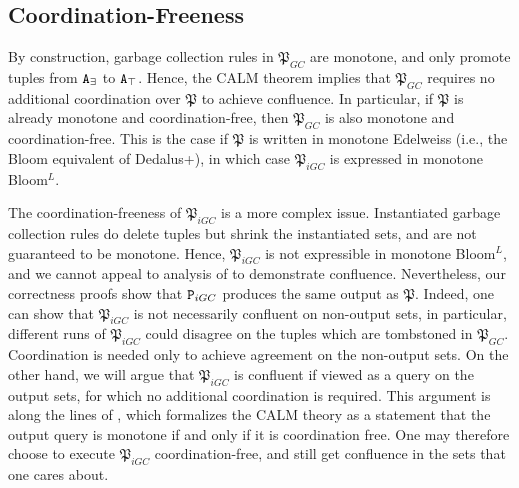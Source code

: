 \subsection{Coordination-Freeness}
By construction, garbage collection rules in $\mathfrak{P}_{GC}$ are monotone, and only promote tuples from $\tt{A}_\exists$ to $\tt{A}_\top$.
Hence, the CALM theorem implies that $\mathfrak{P}_{GC}$ requires no additional coordination over $\mathfrak{P}$ to achieve confluence.
In particular, if $\mathfrak{P}$ is already monotone and coordination-free, then $\mathfrak{P}_{GC}$ is also monotone and coordination-free.
This is the case if $\mathfrak{P}$ is written in monotone Edelweiss (i.e., the Bloom equivalent of Dedalus+), in which case $\mathfrak{P}_{iGC}$ is expressed in monotone Bloom$^L$.

The coordination-freeness of $\mathfrak{P}_{iGC}$ is a more complex issue.
Instantiated garbage collection rules do delete tuples but shrink the instantiated sets, and are not guaranteed to be monotone.
Hence, $\mathfrak{P}_{iGC}$ is not expressible in monotone Bloom$^L$, and we cannot appeal to analysis of \cite{marczak2012confluence} to demonstrate confluence.
Nevertheless, our correctness proofs show that $\tt{P}_{iGC}$ produces the same output as $\mathfrak{P}$.
Indeed, one can show that $\mathfrak{P}_{iGC}$ is not necessarily confluent on non-output sets, in particular, different runs of $\mathfrak{P}_{iGC}$ could disagree on the tuples which are tombstoned in $\mathfrak{P}_{GC}$.
Coordination is needed only to achieve agreement on the non-output sets.
On the other hand, we will argue that $\mathfrak{P}_{iGC}$ is confluent if viewed as a query on the output sets, for which no additional coordination is required.
This argument is along the lines of \cite{ameloot2013relational}, which formalizes the CALM theory as a statement that the output query is monotone if and only if it is coordination free.
One may therefore choose to execute $\mathfrak{P}_{iGC}$ coordination-free, and still get confluence in the sets that one cares about.








